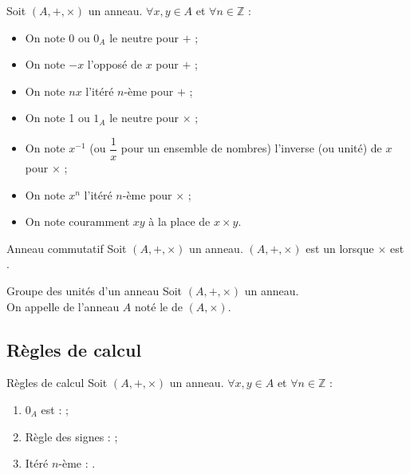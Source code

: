 \documentclass[12pt,a4paper]{report}
\begin{document}
    \begin{remarque}[Notations]
    Soit $(A, +, \times)$ un anneau. $\forall x, y \in A$ et $\forall n \in \mathbb{Z}$ :
    \begin{multicols}{2}
    \begin{itemize}[label=$\cdot$]
        \item On note 0 ou $0_A$ le neutre pour $+$ ;
        \item On note $-x$ l'opposé de $x$ pour $+$ ;
        \item On note $nx$ l'itéré $n$-ème pour $+$ ;
        \item On note 1 ou $1_A$ le neutre pour $\times$ ;
        \item On note $x^{-1}$ (ou $\dfrac{1}{x}$ pour un ensemble de nombres) l'inverse (ou unité) de $x$ pour $\times$ ;
        \item On note $x^n$ l'itéré $n$-ème pour $\times$ ;
        \item On note couramment $xy$ à la place de $x \times y$.
    \end{itemize}
    \end{multicols}
    \end{remarque}
    
    \begin{definition}{Anneau commutatif}{}
    Soit $(A, +, \times)$ un anneau. $(A, +, \times)$ est un  lorsque $\times$ est .
    \end{definition}
    
    \begin{definition}{Groupe des unités d'un anneau}{}
    Soit $(A, +, \times)$ un anneau.\\
    On appelle  de l'anneau $A$ noté  le  de $(A, \times)$.
    \end{definition}
    
    \pagebreak
    
    \subsection{Règles de calcul}
    
    \begin{propositions}{Règles de calcul}{}
    Soit $(A, +, \times)$ un anneau. $\forall x, y \in A$ et $\forall n \in \mathbb{Z}$ :
    \begin{enumerate}[label=\bfseries\arabic*)]
        \item $0_A$ est  :  ;
        \item Règle des signes :  ;
        \item Itéré $n$-ème : .
    \end{enumerate}
    \end{propositions}
    
\end{document}
